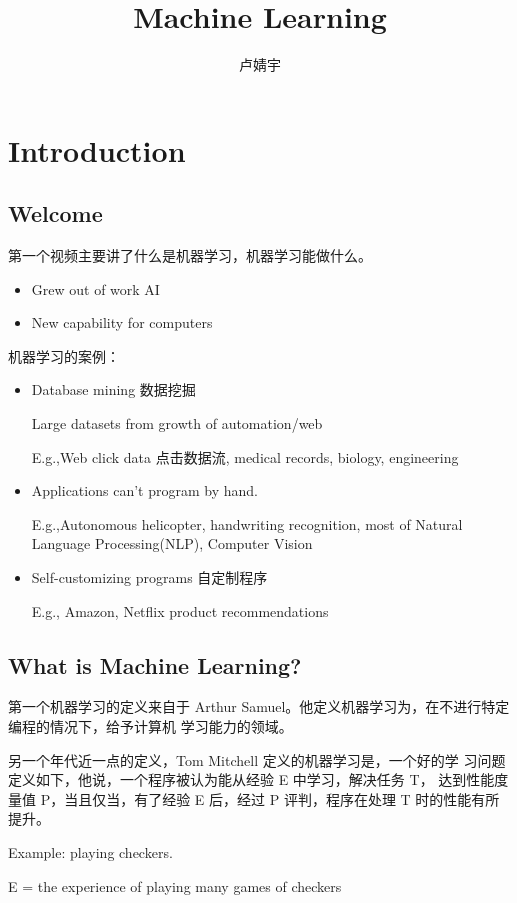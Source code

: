 \documentclass[UTF8]{ctexart}
\title{\heiti Machine Learning}
\author{卢婧宇}
\begin{document}
\maketitle
\tableofcontents

\newpage
\section{Introduction}
\subsection{Welcome}
 第一个视频主要讲了什么是机器学习，机器学习能做什么。
\begin{itemize}
  \item Grew out of work AI

  \item New capability for computers
\end{itemize}

 机器学习的案例：
\begin{itemize}
  \item Database mining 数据挖掘

    Large datasets from growth of automation/web

    E.g.,Web click data 点击数据流, medical records, biology, engineering

  \item Applications can't program by hand.

    E.g.,Autonomous helicopter, handwriting recognition, most of Natural Language Processing(NLP), Computer Vision
  \item Self-customizing programs 自定制程序

   E.g., Amazon, Netflix product recommendations
\end{itemize}
\subsection{What is Machine Learning?}
第一个机器学习的定义来自于 Arthur Samuel。他定义机器学习为，在不进行特定编程的情况下，给予计算机 学习能力的领域。

另一个年代近一点的定义，Tom Mitchell 定义的机器学习是，一个好的学 习问题定义如下，他说，一个程序被认为能从经验 E 中学习，解决任务 T，
达到性能度量值 P，当且仅当，有了经验 E 后，经过 P 评判，程序在处理 T 时的性能有所提升。

Example: playing checkers.

E = the experience of playing many games of checkers
\end{document}
